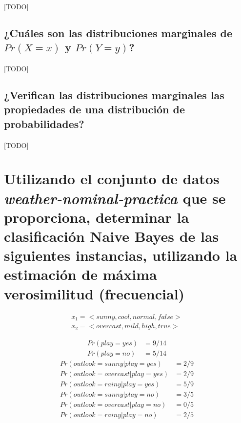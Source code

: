 \documentclass{article}
\begin{document}
			\paragraph{}
			[TODO]

		\subsection{¿Cuáles son las distribuciones marginales de $Pr(X = x)$ y $Pr(Y = y)$?}

			\paragraph{}
			[TODO]

		\subsection{¿Verifican las distribuciones marginales las propiedades de una distribución de probabilidades?}

			\paragraph{}
			[TODO]

	\section{Utilizando el conjunto de datos \emph{weather-nominal-practica} que se proporciona, determinar la clasificación Naive Bayes de las siguientes instancias, utilizando la estimación de máxima verosimilitud (frecuencial)}
	\label{sec:e3}

		\begin{align}
			x_1 = <sunny, cool, normal, false> \\
			x_2 = <overcast, mild, high, true>
		\end{align}

		\begin{align}
			Pr(play = yes) &= 9/14 \\
			Pr(play = no) &= 5/14
		\end{align}
		\begin{align}
			Pr(outlook = sunny 		| play = yes) &= 2/9 \\
			Pr(outlook = overcast | play = yes) &= 2/9 \\
			Pr(outlook = rainy 		| play = yes) &= 5/9 \\
			Pr(outlook = sunny 		| play = no) &= 3/5 \\
			Pr(outlook = overcast | play = no) &= 0/5 \\
			Pr(outlook = rainy 		| play = no) &= 2/5
		\end{align}
\end{document}
